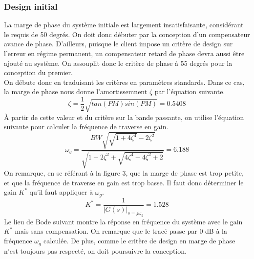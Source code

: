 \documentclass{udes_rapport} %
\begin{document}
\subsubsection{Design initial}
La marge de phase du système initiale est largement insatisfaisante, considérant le requis de 50 degrés. On doit donc débuter par la conception d'un compensateur avance de phase. D'ailleurs, puisque le client impose un critère de design sur l'erreur en régime permanent, un compensateur retard de phase devra aussi être ajouté au système. On assouplit donc le critère de phase à 55 degrés pour la conception du premier.\\
On débute donc en traduisant les critères en paramètres standards. Dans ce cas, la marge de phase nous donne l'amortissemnent $\zeta$ par l'équation suivante.
\[ \zeta =  \frac{1}{2}\sqrt{tan(PM)sin(PM)} = 0.5408\]
À partir de cette valeur et du critère sur la bande passante, on utilise l'équation suivante pour calculer la fréquence de traverse en gain.
\[ \omega_g =  \frac{BW\sqrt{\sqrt{1+4\zeta^4}-2\zeta^2}}{\sqrt{1-2\zeta^2+\sqrt{4\zeta^4-4\zeta^2+2}}} = 6.188\]
On remarque, en se référant à la figure 3, que la marge de phase est trop petite, et que la fréquence de traverse en gain est trop basse. Il faut donc déterminer le gain $K^*$ qu'il faut appliquer à $\omega_g$.
\[K^* = \frac{1}{|G(s)|_{s=j\omega_g}} = 1.528\]
Le lieu de Bode suivant montre la réponse en fréquence du système avec le gain $K^*$ mais sans compensation. On remarque que le tracé passe par 0 dB à la fréquence $\omega_g$ calculée. De plus, comme le critère de design en marge de phase n'est toujours pas respecté, on doit poursuivre la conception.

\end{document}
